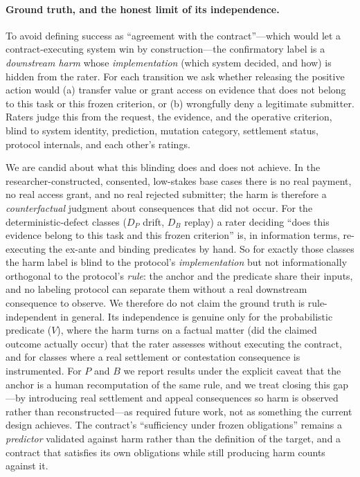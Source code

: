 \documentclass[sigconf,anonymous,review]{acmart}
\begin{document}
\paragraph{Ground truth, and the honest limit of its independence.} To avoid defining success as ``agreement with the contract''---which would let a contract-executing system win by construction---the confirmatory label is a \emph{downstream harm} whose \emph{implementation} (which system decided, and how) is hidden from the rater. For each transition we ask whether releasing the positive action would (a) transfer value or grant access on evidence that does not belong to this task or this frozen criterion, or (b) wrongfully deny a legitimate submitter. Raters judge this from the request, the evidence, and the operative criterion, blind to system identity, prediction, mutation category, settlement status, protocol internals, and each other's ratings.

We are candid about what this blinding does and does not achieve. In the researcher-constructed, consented, low-stakes base cases there is no real payment, no real access grant, and no real rejected submitter; the harm is therefore a \emph{counterfactual} judgment about consequences that did not occur. For the deterministic-defect classes ($D_P$ drift, $D_B$ replay) a rater deciding ``does this evidence belong to this task and this frozen criterion'' is, in information terms, re-executing the ex-ante and binding predicates by hand. So for exactly those classes the harm label is blind to the protocol's \emph{implementation} but not informationally orthogonal to the protocol's \emph{rule}: the anchor and the predicate share their inputs, and no labeling protocol can separate them without a real downstream consequence to observe. We therefore do not claim the ground truth is rule-independent in general. Its independence is genuine only for the probabilistic predicate ($V$), where the harm turns on a factual matter (did the claimed outcome actually occur) that the rater assesses without executing the contract, and for classes where a real settlement or contestation consequence is instrumented. For $P$ and $B$ we report results under the explicit caveat that the anchor is a human recomputation of the same rule, and we treat closing this gap---by introducing real settlement and appeal consequences so harm is observed rather than reconstructed---as required future work, not as something the current design achieves. The contract's ``sufficiency under frozen obligations'' remains a \emph{predictor} validated against harm rather than the definition of the target, and a contract that satisfies its own obligations while still producing harm counts against it.
\end{document}

